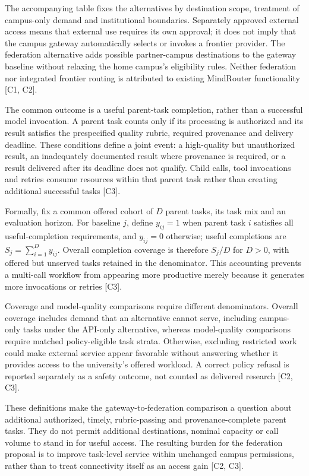 \documentclass[11pt]{article}
\begin{document}
The accompanying table fixes the alternatives by destination scope, treatment of campus-only demand and institutional boundaries. Separately approved external access means that external use requires its own approval; it does not imply that the campus gateway automatically selects or invokes a frontier provider. The federation alternative adds possible partner-campus destinations to the gateway baseline without relaxing the home campus\textquoteright{}s eligibility rules. Neither federation nor integrated frontier routing is attributed to existing MindRouter functionality [C1, C2].

The common outcome is a useful parent-task completion, rather than a successful model invocation. A parent task counts only if its processing is authorized and its result satisfies the prespecified quality rubric, required provenance and delivery deadline. These conditions define a joint event: a high-quality but unauthorized result, an inadequately documented result where provenance is required, or a result delivered after its deadline does not qualify. Child calls, tool invocations and retries consume resources within that parent task rather than creating additional successful tasks [C3].

Formally, fix a common offered cohort of $D$ parent tasks, its task mix and an evaluation horizon. For baseline $j$, define $y_{ij}=1$ when parent task $i$ satisfies all useful-completion requirements, and $y_{ij}=0$ otherwise; useful completions are $S_j=\sum_{i=1}^{D}y_{ij}$. Overall completion coverage is therefore $S_j/D$ for $D>0$, with offered but unserved tasks retained in the denominator. This accounting prevents a multi-call workflow from appearing more productive merely because it generates more invocations or retries [C3].

Coverage and model-quality comparisons require different denominators. Overall coverage includes demand that an alternative cannot serve, including campus-only tasks under the API-only alternative, whereas model-quality comparisons require matched policy-eligible task strata. Otherwise, excluding restricted work could make external service appear favorable without answering whether it provides access to the university\textquoteright{}s offered workload. A correct policy refusal is reported separately as a safety outcome, not counted as delivered research [C2, C3].

These definitions make the gateway-to-federation comparison a question about additional authorized, timely, rubric-passing and provenance-complete parent tasks. They do not permit additional destinations, nominal capacity or call volume to stand in for useful access. The resulting burden for the federation proposal is to improve task-level service within unchanged campus permissions, rather than to treat connectivity itself as an access gain [C2, C3].
\end{document}
